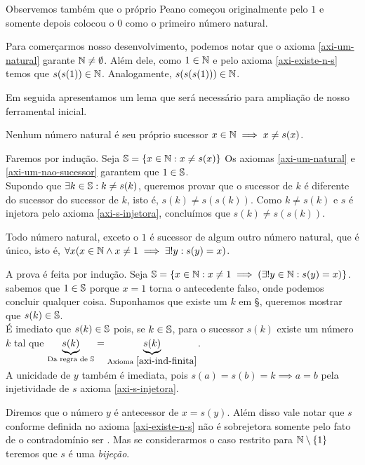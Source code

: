 \documentclass[../main.tex]{subfiles}
\begin{document}
Observemos também que o próprio Peano começou originalmente pelo $1$ e somente depois colocou o $0$ como o primeiro número natural.

Para comerçarmos nosso desenvolvimento, podemos notar que o axioma \ref{axi-um-natural} garante $\N \neq \emptyset $. Além dele, como $1 \in \N$ e pelo axioma \ref{axi-existe-n-s} temos que $s(s(1)) \in \N$. Analogamente, $s(s(s(1))) \in \N$.

Em seguida apresentamos um lema que será necessário para ampliação de nosso ferramental inicial.
\begin{lema}{Nenhum número natural é seu próprio sucessor}\label{n-dif-sucessor}
    $x \in \N \implies x \neq s(x) $.
\end{lema}
\begin{dem}
    Faremos por indução. Seja $\S = \{x \in \N : x \neq s(x) \}$
    Os axiomas \ref{axi-um-natural} e \ref{axi-um-nao-sucessor} garantem que $1 \in \S$.\\
    Supondo que $\exists k \in \S : k \neq s(k)$, queremos provar que o sucessor de $k$ é diferente do sucessor do sucessor de $k$, isto é, $s(k) \neq s(s(k))$. Como $k \neq s(k)$ e $s$ é injetora pelo axioma \ref{axi-s-injetora}, concluímos que $s(k) \neq s(s(k))$.
\end{dem}
\begin{teo}\label{suc-unico}
    Todo número natural, exceto o $1$ é sucessor de algum outro número natural, que é único, isto é, $\forall x (x \in \N \land x \neq 1 \implies \exists! y : s(y) = x)$.
\end{teo}
\begin{dem}
    A prova é feita por indução. Seja $\S = \{x \in \N : x \neq 1 \implies (\exists!y \in \N : s(y) = x)\}$.\\
    sabemos que $1 \in \S$ porque $x = 1$ torna o antecedente falso, onde podemos concluir qualquer coisa. Suponhamos que existe um $k$ em \S, queremos mostrar que $s(k) \in \S$. \\
    É imediato que $s(k) \in \S$ pois, se $k \in \S$, para o sucessor $s(k)$ existe um número $k$ tal que $\underbrace{s(k)}_{\text{Da regra de } \S} = \underbrace{s(k)}_{\text{Axioma }\ref{axi-ind-finita}}$.\\
    A unicidade de $y$ também é imediata, pois $s(a) = s(b) = k \implies a = b$ pela injetividade de $s$ axioma \ref{axi-s-injetora}.
\end{dem}
\begin{obs}
    Diremos que o número $y$ é antecessor de $x = s(y)$. Além disso vale notar que $s$ conforme definida no axioma \ref{axi-existe-n-s} não é sobrejetora somente pelo fato de o contradomínio ser \N. Mas se considerarmos o caso restrito para $\N \setminus \{1\}$ 
    teremos que $s$ é uma \emph{bijeção}.
\end{obs}
\end{document}

